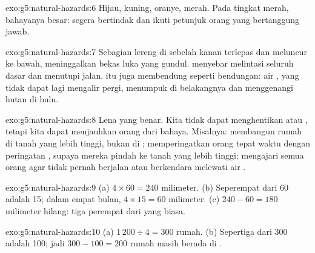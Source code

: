 \begin{solution}{exo:g5:natural-hazards:6}
Hijau, kuning, oranye, merah. Pada tingkat merah, bahayanya besar: segera
bertindak dan ikuti petunjuk orang yang bertanggung jawab.
\end{solution}

\begin{solution}{exo:g5:natural-hazards:7}
Sebagian lereng  di sebelah kanan terlepas dan meluncur ke bawah,
meninggalkan bekas luka yang gundul.  menyebar melintasi seluruh
dasar  dan menutupi jalan.  itu juga membendung  seperti
bendungan: air , yang tidak dapat lagi mengalir pergi, menumpuk di
belakangnya dan menggenangi hutan di hulu.
\end{solution}

\begin{solution}{exo:g5:natural-hazards:8}
Lena yang benar. Kita tidak dapat menghentikan  atau , tetapi
kita dapat menjauhkan orang dari bahaya. Misalnya: membangun rumah di tanah
yang lebih tinggi, bukan di ; memperingatkan orang tepat
waktu dengan peringatan , supaya mereka pindah ke tanah yang lebih
tinggi; mengajari semua orang agar tidak pernah berjalan atau berkendara
melewati air .
\end{solution}

\begin{solution}{exo:g5:natural-hazards:9}
(a) $4 \times 60 = 240$ milimeter. (b) Seperempat dari 60 adalah 15; dalam
empat bulan, $4 \times 15 = 60$ milimeter. (c) $240 - 60 = 180$ milimeter
hilang: tiga perempat dari  yang biasa.
\end{solution}

\begin{solution}{exo:g5:natural-hazards:10}
(a) $1\,200 \div 4 = 300$ rumah. (b) Sepertiga dari 300 adalah 100; jadi
$300 - 100 = 200$ rumah masih berada di .
\end{solution}

